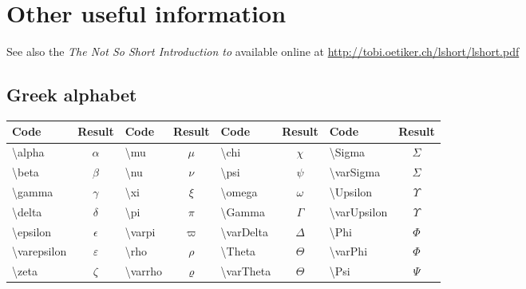 \newpage
\section{Other useful information}

See also the \textit{The Not So Short Introduction to \LaTeXe} available online at \url{http://tobi.oetiker.ch/lshort/lshort.pdf}

\subsection{Greek alphabet}

\begin{center}
\begin{tabular}{|l|c||l|c|l|c||l|c|} \hline
Code                        & Result            & Code                        & Result      & Code                        & Result          & Code                        & Result          \\ \hline \hline
\textbackslash alpha        & $\alpha$          & \textbackslash mu           & $\mu$       & \textbackslash chi          & $\chi$          & \textbackslash Sigma        & $\Sigma$        \\ \hline
\textbackslash beta         & $\beta$           & \textbackslash nu           & $\nu$       & \textbackslash psi          & $\psi$          & \textbackslash varSigma     & $\varSigma$     \\ \hline
\textbackslash gamma        & $\gamma$          & \textbackslash xi           & $\xi$       & \textbackslash omega        & $\omega$        & \textbackslash Upsilon      & $\Upsilon$      \\ \hline
\textbackslash delta        & $\delta$          & \textbackslash pi           & $\pi$       & \textbackslash Gamma        & $\Gamma$        & \textbackslash varUpsilon   & $\varUpsilon$   \\ \hline
\textbackslash epsilon      & $\epsilon$        & \textbackslash varpi        & $\varpi$    & \textbackslash varDelta     & $\varDelta$     & \textbackslash Phi          & $\Phi$          \\ \hline
\textbackslash varepsilon   & $\varepsilon$     & \textbackslash rho          & $\rho$      & \textbackslash Theta        & $\Theta$        & \textbackslash varPhi       & $\varPhi$       \\ \hline
\textbackslash zeta         & $\zeta$           & \textbackslash varrho       & $\varrho$   & \textbackslash varTheta     & $\varTheta$     & \textbackslash Psi          & $\Psi$          \\ \hline

\end{tabular}
\end{center}
